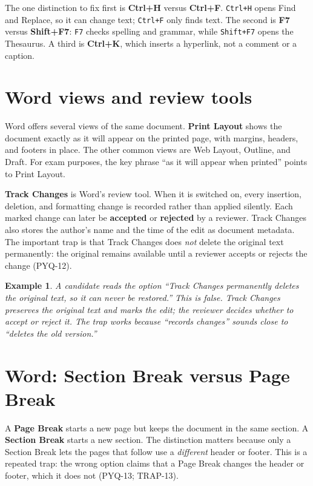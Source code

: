 \documentclass[11pt]{article}
\newtheorem{example}{Example}[section]
\begin{document}
The one distinction to fix first is \textbf{Ctrl+H} versus \textbf{Ctrl+F}.
\texttt{Ctrl+H} opens Find and Replace, so it can change text;
\texttt{Ctrl+F} only finds text. The second is \textbf{F7} versus
\textbf{Shift+F7}: \texttt{F7} checks spelling and grammar, while
\texttt{Shift+F7} opens the Thesaurus. A third is \textbf{Ctrl+K}, which
inserts a hyperlink, not a comment or a caption.

\section{Word views and review tools}
Word offers several views of the same document. \textbf{Print Layout} shows
the document exactly as it will appear on the printed page, with margins,
headers, and footers in place. The other common views are Web Layout, Outline,
and Draft. For exam purposes, the key phrase ``as it will appear when printed''
points to Print Layout.

\textbf{Track Changes} is Word's review tool. When it is switched on, every
insertion, deletion, and formatting change is recorded rather than applied
silently. Each marked change can later be \textbf{accepted} or
\textbf{rejected} by a reviewer. Track Changes also stores the author's name
and the time of the edit as document metadata. The important trap is that
Track Changes does \emph{not} delete the original text permanently: the
original remains available until a reviewer accepts or rejects the change
(PYQ-12).

\begin{example}
A candidate reads the option ``Track Changes permanently deletes the original
text, so it can never be restored.'' This is false. Track Changes preserves
the original text and marks the edit; the reviewer decides whether to accept
or reject it. The trap works because ``records changes'' sounds close to
``deletes the old version.''
\end{example}

\section{Word: Section Break versus Page Break}
A \textbf{Page Break} starts a new page but keeps the document in the same
section. A \textbf{Section Break} starts a new section. The distinction
matters because only a Section Break lets the pages that follow use a
\emph{different} header or footer. This is a repeated trap: the wrong option
claims that a Page Break changes the header or footer, which it does not
(PYQ-13; TRAP-13).
\end{document}
